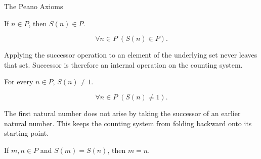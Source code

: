 \begin{topicbox}{The Peano Axioms}
\NoLocalDependencies

\begin{tcolorbox}[colback=axiombox, colframe=axiomborder, arc=2pt,
  left=6pt, right=6pt, top=4pt, bottom=4pt,
  title={\small\textbf{Axiom (Closure Under Successor)}},
  fonttitle=\small\bfseries]
\begin{axiom}
\label{ax:peano-successor-closure}
If $n \in P$, then $S(n) \in P$.
\end{axiom}
\end{tcolorbox}

\begin{remark*}
\[
\forall n \in P\;(S(n) \in P).
\]
\end{remark*}

\begin{remark*}[Interpretation]
Applying the successor operation to an element of the underlying set never
leaves that set. Successor is therefore an internal operation on the counting
system.
\end{remark*}

\NoLocalDependencies

\begin{tcolorbox}[colback=axiombox, colframe=axiomborder, arc=2pt,
  left=6pt, right=6pt, top=4pt, bottom=4pt,
  title={\small\textbf{Axiom (One Is Not a Successor)}},
  fonttitle=\small\bfseries]
\begin{axiom}
\label{ax:peano-one-not-successor}
For every $n \in P$, $S(n) \neq 1$.
\end{axiom}
\end{tcolorbox}

\begin{remark*}
\[
\forall n \in P\;(S(n) \neq 1).
\]
\end{remark*}

\begin{remark*}[Interpretation]
The first natural number does not arise by taking the successor of an earlier
natural number. This keeps the counting system from folding backward onto its
starting point.
\end{remark*}

\NoLocalDependencies

\begin{tcolorbox}[colback=axiombox, colframe=axiomborder, arc=2pt,
  left=6pt, right=6pt, top=4pt, bottom=4pt,
  title={\small\textbf{Axiom (Injectivity of Successor)}},
  fonttitle=\small\bfseries]
\begin{axiom}
\label{ax:peano-successor-injective}
If $m,n \in P$ and $S(m)=S(n)$, then $m=n$.
\end{axiom}
\end{tcolorbox}


\end{topicbox}
